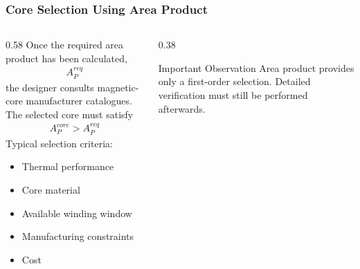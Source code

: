 \begin{frame} 
    \frametitle{Core Selection Using Area Product}
    \begin{columns} 
        \begin{column}{0.58\textwidth} 
            Once the required area product has been calculated,
            \begin{align} 
                A_P^{req} 
            \end{align} 
            the designer consults magnetic-core manufacturer catalogues. 
            \vspace{0.15cm} 
            The selected core must satisfy 
            \begin{align} 
                A_P^{core} > A_P^{req} 
            \end{align} 
            \vspace{0.15cm} Typical selection criteria:
            \begin{itemize} 
                \item Thermal performance 
                \item Core material 
                \item Available winding window 
                \item Manufacturing constraints 
                \item Cost 
            \end{itemize} 
        \end{column} 
        \begin{column}{0.38\textwidth} 
            \begin{block}{Important Observation} Area product provides only a first-order selection. \vspace{0.15cm} Detailed verification must still be performed afterwards. 
            \end{block} 
        \end{column} 
    \end{columns} 
\end{frame} 

